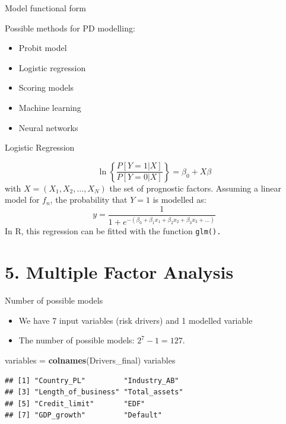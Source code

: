 \documentclass[9pt,ignorenonframetext,]{beamer}
\newenvironment{Shaded}{\begin{snugshade}}{\end{snugshade}}
\newcommand{\KeywordTok}[1]{\textcolor[rgb]{0.13,0.29,0.53}{\textbf{#1}}}
\newcommand{\StringTok}[1]{\textcolor[rgb]{0.31,0.60,0.02}{#1}}
\newcommand{\NormalTok}[1]{#1}
\providecommand{\tightlist}{%
  \setlength{\itemsep}{0pt}\setlength{\parskip}{0pt}}
\begin{document}
\begin{frame}{Model functional form}

Possible methods for PD modelling:

\begin{itemize}
\tightlist
\item
  Probit model
\item
  Logistic regression
\item
  Scoring models
\item
  Machine learning
\item
  Neural networks
\end{itemize}

\end{frame}

\begin{frame}{Logistic Regression}

\[ \ln \left\{ \frac{P[Y=1|X]}{P[Y=0|X]} \right\} = \beta_0 + X\beta \]
with \(X = (X_1, X_2, \ldots, X_N)\) the set of prognostic factors.
Assuming a linear model for \(f_n\), the probability that \(Y=1\) is
modelled as:
\[y = \frac{1}{1+e^{-(\beta_0+\beta_1 x_1+\beta_2 x_2+\beta_3 x_3+\ldots)}}\]
In R, this regression can be fitted with the function \tt{glm()}.

\end{frame}

\section{5. Multiple Factor Analysis}\label{multiple-factor-analysis}

\begin{frame}[fragile]{Number of possible models}

\begin{itemize}
\tightlist
\item
  We have 7 input variables (risk drivers) and 1 modelled variable
\item
  The number of possible models: \(2^7 - 1 = 127.\)
\end{itemize}

\begin{Shaded}
\begin{Highlighting}[]
\NormalTok{variables =}\StringTok{ }\KeywordTok{colnames}\NormalTok{(Drivers_final)}
\NormalTok{variables}
\end{Highlighting}
\end{Shaded}

\begin{verbatim}
## [1] "Country_PL"         "Industry_AB"       
## [3] "Length_of_business" "Total_assets"      
## [5] "Credit_limit"       "EDF"               
## [7] "GDP_growth"         "Default"
\end{verbatim}

\end{frame}
\end{document}
